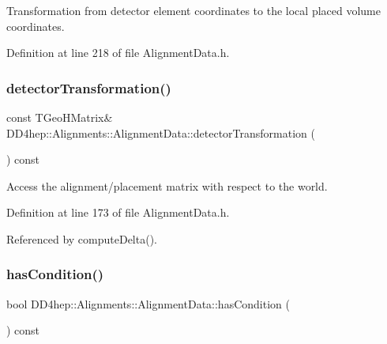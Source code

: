 Transformation from detector element coordinates to the local placed volume coordinates. 



Definition at line 218 of file Alignment\+Data.\+h.

\hypertarget{class_d_d4hep_1_1_alignments_1_1_alignment_data_a0f974ebbad82f5f6af363063b65314d9}{}\label{class_d_d4hep_1_1_alignments_1_1_alignment_data_a0f974ebbad82f5f6af363063b65314d9} 
\subsubsection{\texorpdfstring{detector\+Transformation()}{detectorTransformation()}}
{\footnotesize\ttfamily const T\+Geo\+H\+Matrix\& D\+D4hep\+::\+Alignments\+::\+Alignment\+Data\+::detector\+Transformation (\begin{DoxyParamCaption}{ }\end{DoxyParamCaption}) const\hspace{0.3cm}{\ttfamily [inline]}}



Access the alignment/placement matrix with respect to the world. 



Definition at line 173 of file Alignment\+Data.\+h.



Referenced by compute\+Delta().

\hypertarget{class_d_d4hep_1_1_alignments_1_1_alignment_data_a6429a147760dfb958e1aea96a6501836}{}\label{class_d_d4hep_1_1_alignments_1_1_alignment_data_a6429a147760dfb958e1aea96a6501836} 
\subsubsection{\texorpdfstring{has\+Condition()}{hasCondition()}}
{\footnotesize\ttfamily bool D\+D4hep\+::\+Alignments\+::\+Alignment\+Data\+::has\+Condition (\begin{DoxyParamCaption}{ }\end{DoxyParamCaption}) const\hspace{0.3cm}{\ttfamily [inline]}}



